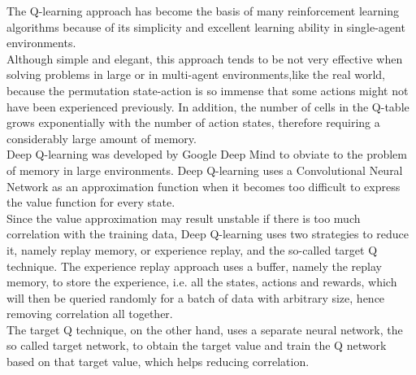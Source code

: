 \documentclass[conference]{IEEEtran}
\begin{document}
The Q-learning approach has become the basis of many reinforcement learning algorithms because of its simplicity and excellent learning ability in single-agent environments. \cite{Q_learning}\\
Although simple and elegant, this approach tends to be not very effective when solving problems in large or in multi-agent environments,like the real world, because the permutation state-action is so immense that some actions might not have been experienced previously. In addition, the number of cells in the Q-table grows exponentially with the number of action states, therefore requiring a considerably large amount of memory. \cite{Q_learning}\\
Deep Q-learning was developed by Google Deep Mind to obviate to the problem of memory in large environments. Deep Q-learning uses a Convolutional Neural Network as an approximation function when it becomes too difficult to express the value function for every state.
\cite{Q_learning}\\
Since the value approximation may result unstable if there is too much correlation with the training data, Deep Q-learning uses two strategies to reduce it, namely replay memory, or experience replay, and the so-called target Q technique. 
The experience replay approach uses a buffer, namely the replay memory, to store the experience, i.e. all the states, actions and rewards, which will then be queried randomly for a batch of data with arbitrary size, hence removing correlation all together. \cite{Q_learning}\\
The target Q technique, on the other hand, uses a separate neural network, the so called target network, to obtain the target value and train the Q network based on that target value, which helps reducing correlation. \cite{Q_learning}\\
\end{document}
